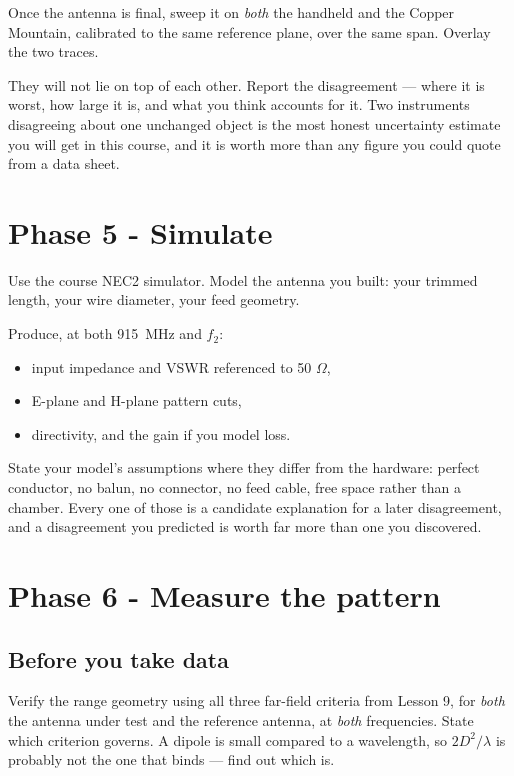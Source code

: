 \documentclass{exam}
\def\fOne{915}
\begin{document}
Once the antenna is final, sweep it on \emph{both} the handheld and the Copper
Mountain, calibrated to the same reference plane, over the same span. Overlay
the two traces.

They will not lie on top of each other. Report the disagreement --- where it is
worst, how large it is, and what you think accounts for it. Two instruments
disagreeing about one unchanged object is the most honest uncertainty estimate
you will get in this course, and it is worth more than any figure you could
quote from a data sheet.

\section{Phase 5 - Simulate}

Use the course NEC2 simulator. Model the antenna you built: your trimmed
length, your wire diameter, your feed geometry.

Produce, at both \fOne\ MHz and $f_2$:

\begin{itemize}[nosep]
	\item input impedance and VSWR referenced to 50 $\Omega$,
	\item E-plane and H-plane pattern cuts,
	\item directivity, and the gain if you model loss.
\end{itemize}

State your model's assumptions where they differ from the hardware: perfect
conductor, no balun, no connector, no feed cable, free space rather than a
chamber. Every one of those is a candidate explanation for a later
disagreement, and a disagreement you predicted is worth far more than one you
discovered.

\section{Phase 6 - Measure the pattern}

\subsection{Before you take data}

Verify the range geometry using all three far-field criteria from Lesson 9,
for \emph{both} the antenna under test and the reference antenna, at
\emph{both} frequencies. State which criterion governs. A dipole is small
compared to a wavelength, so $2D^2/\lambda$ is probably not the one that binds
--- find out which is.
\end{document}
